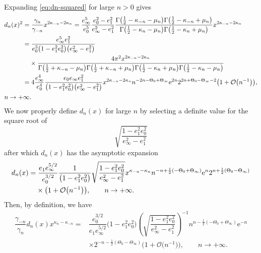\documentclass[11pt]{article}
\numberwithin{equation}{section}
\numberwithin{equation}{section}
\newcommand{\ee}{\mathrm{e}}
\begin{document}
Expanding \eqref{eq:dn-squared} for large $n>0$ gives
\begin{align*}
& d_n(x)^2= \frac{\gamma_n}{\gamma_{-n}}x^{2\kappa_{-n}-2\kappa_n} = \dfrac{e_\infty^5}{e_0^5} \dfrac{e_0^2 - e_1^2}{e_\infty^2 - e_1^2} \dfrac{\Gamma\big( \frac{1}{2} - \kappa_{-n} -\mu_n\big) \Gamma\big( \frac{1}{2} - \kappa_{-n} + \mu_n\big)}{\Gamma\big( \frac{1}{2} - \kappa_{n} -\mu_n\big) \Gamma\big( \frac{1}{2} - \kappa_{n} +\mu_n\big)} x^{2\kappa_{-n}-2\kappa_n}\\
&\hphantom{d_n(x)^2}{} = \dfrac{e_\infty^5 e_1^2}{e_0^3\big(1 - e_1^2 e_0^2\big)\big(e_\infty^2 - e_1^2\big)} \\
&\hphantom{d_n(x)^2=}{} \times\dfrac{ 4\pi^2x^{2\kappa_{-n}-2\kappa_n}}{\Gamma \big( \frac{1}{2} + \kappa_{-n}- \mu_n \big) \Gamma \big( \frac{1}{2} + \kappa_{-n} + \mu_n \big) \Gamma \big( \frac{1}{2} - \kappa_n + \mu_n\big) \Gamma \big( \frac{1}{2} - \kappa_n - \mu_n \big)} \\
&\hphantom{d_n(x)^2}{}=
 4\dfrac{e_\infty^4}{e_0^4}\dfrac{e_0e_\infty e_1^2}{\big(1 - e_1^2 e_0^2\big)\big(e_\infty^2 - e_1^2\big)} x^{2\kappa_{-n}-2\kappa_n}n^{-2n-\Theta_0+\Theta_\infty}\ee^{2n}2^{2n+\Theta_0-\Theta_\infty-2}\big(1+\mathcal{O}\big(n^{-1}\big)\big), \\
& n \to +\infty.
\end{align*}
We now properly define $d_n(x)$ for large $n$ by selecting a definite value for the square root of
\begin{equation}
\label{eq:V-root}
\sqrt{\dfrac{1 - e_1^2 e_0^2}{e_\infty^2 - e_1^2} }
\end{equation}
after which $d_n(x)$ has the asymptotic expansion
\begin{align*}
&d_n(x) = \dfrac{e_1 e_\infty^{5/2}}{e_0^{3/2}} \dfrac{1}{\big(1 - e_1^2 e_0^2\big)}\sqrt{\dfrac{1 - e_1^2 e_0^2}{e_\infty^2 - e_1^2} } x^{\kappa_{-n}-\kappa_n} n^{-n+\frac{1}{2}(-\Theta_0+\Theta_\infty)}\ee^{n}2^{n + \frac{1}{2}(\Theta_0-\Theta_\infty)}\\
&\hphantom{d_n(x) =}{}
\times\big(1+\mathcal{O}\big(n^{-1}\big)\big), \qquad n \to +\infty.
\end{align*}
Then, by definition, we have
\begin{align*}
\dfrac{\gamma_{-n}}{\gamma_n} d_n(x) x^{\kappa_n - \kappa_{-n}} ={}& \dfrac{e_0^{3/2}}{e_1 e_\infty^{5/2}} {\big(1 - e_1^2 e_0^2\big)}\left(\sqrt{\dfrac{1 - e_1^2 e_0^2}{e_\infty^2 - e_1^2} }\right)^{-1}n^{n-\frac{1}{2}(-\Theta_0+\Theta_\infty)}\ee^{-n}\\&
\times2^{-n - \frac{1}{2}(\Theta_0-\Theta_\infty)}\big(1+\mathcal{O}\big(n^{-1}\big)\big),\qquad n \to +\infty.
\end{align*}
\end{document}
